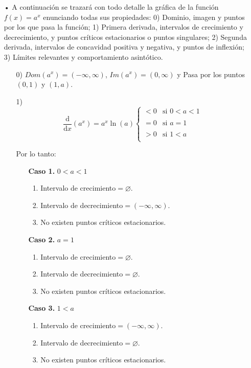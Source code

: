 \documentclass[pts12]{article}
\numberwithin{equation}{section}
\newcommand{\Col}{\color{ProcessBlue}}
\newcommand{\derivate}[2]{\frac{\mathrm{d}}{\mathrm{d}#1} \left(  {#2}  \right)  }
\begin{document}
\begin{itemize}
\item[\Col •] A continuación se trazará con todo detalle la gráfica de la función $f(x)=a^x$ enunciando todas sus propiedades: 0) Dominio, imagen y puntos por los que pasa la función; 1) Primera derivada, intervalos de crecimiento y decrecimiento, y puntos críticos estacionarios o puntos singulares; 2) Segunda derivada, intervalos de concavidad positiva y negativa, y puntos de inflexión; 3) Límites relevantes y comportamiento asintótico. 

\begin{enumerate}
\item[0)] $Dom(a^x)=(-\infty,\infty)$, $Im(a^x)=(0,\infty)$ y Pasa por los puntos $(0,1)$ y $(1,a)$.
\item[1)] $$ \derivate{x}{a^x}=a^x\ln(a)
\left\{
    \begin{array}{lll}
        <0  & \mbox{si } 0<a<1 \\
        \\ =0 & \mbox{si } a=1 \\
        \\ >0 & \mbox{si } 1<a \\
    \end{array}
\right.$$

Por lo tanto:

\begin{enumerate}

\item[\textbf{Caso 1.}]  $0<a<1$
\begin{enumerate}
\item Intervalo de crecimiento$=\varnothing$.
\item Intervalo de decrecimiento$=(-\infty,\infty)$.
\item No existen puntos críticos estacionarios.
\end{enumerate} 

\item[\textbf{Caso 2.}]  $a=1$
\begin{enumerate}
\item Intervalo de crecimiento$=\varnothing$.
\item Intervalo de decrecimiento$=\varnothing$.
\item No existen puntos críticos estacionarios.
\end{enumerate} 

\item[\textbf{Caso 3.}]  $1<a$
\begin{enumerate}
\item Intervalo de crecimiento$=(-\infty,\infty)$.
\item Intervalo de decrecimiento$=\varnothing$.
\item No existen puntos críticos estacionarios.
\end{enumerate} 


\end{enumerate}
\end{enumerate}
\end{itemize}
\end{document}
